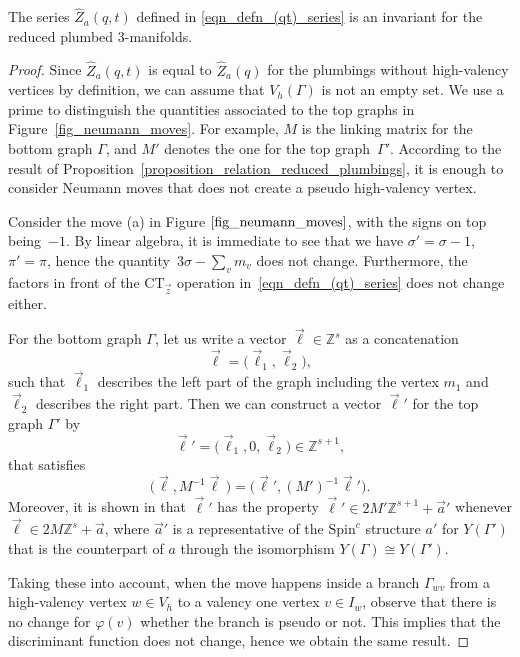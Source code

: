 \begin{Theorem}\label{theorem_invariance}
The series $ \hat{Z}_a(q,t) $ defined in \eqref{eqn_defn_(qt)_series} is an invariant for the reduced plumbed $3$-manifolds.
\end{Theorem}
\begin{proof}
Since $ \hat{Z}_a(q,t)$ is equal to $\hat{Z}_a(q) $ for the plumbings without high-valency vertices by definition, we can assume that $ V_h(\Gamma ) $ is not an empty set. We use a prime to distinguish the quantities associated to the top graphs in Figure~\ref{fig_neumann_moves}. For example, $ M $ is the linking matrix for the bottom graph $ \Gamma $, and $ M' $ denotes the one for the top graph~$ \Gamma' $. According to the result of Proposition~\ref{proposition_relation_reduced_plumbings}, it is enough to consider Neumann moves that does not create a pseudo high-valency vertex.
	
Consider the move (a) in Figure $ \ref{fig_neumann_moves} $, with the signs on top being~$ -1 $. By linear algebra, it is immediate to see that we have $ \sigma'=\sigma-1 $, $ \pi'=\pi $, hence the quantity~$ 3\sigma-\sum_v m_v $ does not change. Furthermore, the factors in front of the $ \text{CT}_{\vec{z}} $ operation in~\eqref{eqn_defn_(qt)_series} does not change either.
	
For the bottom graph $ \Gamma $, let us write a vector $ \vec{\ell}\in \mathbb{Z}^s $ as a concatenation
	\[
	\vec{\ell}=\big(\vec{\ell}_1,\vec{\ell}_2\big),
	\]
	such that $ \vec{\ell}_1 $ describes the left part of the graph including the vertex $ m_1 $ and $ \vec{\ell}_2 $ describes the right part. Then we can construct a vector $ \vec{\ell}' $ for the top graph $ \Gamma' $ by
	\[
	\vec{\ell}'=\big(\vec{\ell}_1,0,\vec{\ell}_2\big)\in \mathbb{Z}^{s+1},
	\]
	that satisfies
	\begin{equation}\label{eqn_ells_relation_move_A}
		\big(\vec{\ell},M^{-1}\vec{\ell}\,\big)=\big(\vec{\ell}',(M')^{-1}\vec{\ell}'\big).
	\end{equation}
	Moreover, it is shown in \cite{gukov} that $ \vec{\ell}' $ has the property $ \vec{\ell}'\in 2M'\mathbb{Z}^{s+1}+\vec{a}' $ whenever $ \vec{\ell}\in 2M\mathbb{Z}^s+\vec{a} $, where $ \vec{a}' $ is a representative of the $ \text{Spin}^c $ structure $ a' $ for $ Y(\Gamma') $ that is the counterpart of $ a $ through the isomorphism $ Y(\Gamma)\cong Y(\Gamma') $.
	
	Taking these into account, when the move happens inside a branch $ \Gamma_{wv} $ from a high-valency vertex $ w\in V_h $ to a valency one vertex $ v\in I_w $, observe that there is no change for $ \varphi(v) $ whether the branch is pseudo or not. This implies that the discriminant function does not change, hence we obtain the same result.
	

\end{proof}
